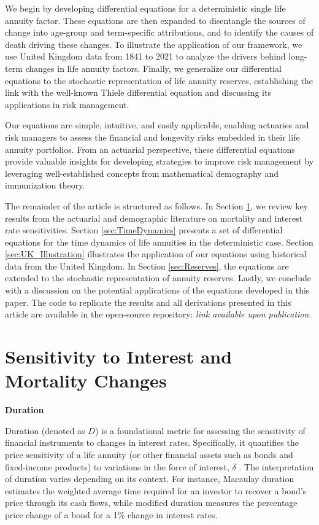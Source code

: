\documentclass[12pt]{article}
\begin{document}
We begin by developing differential equations for a deterministic single life annuity factor. These equations are then expanded to disentangle the sources of change into age-group and term-specific attributions, and to identify the causes of death driving these changes. To illustrate the application of our framework, we use United Kingdom data from 1841 to 2021 to analyze the drivers behind long-term changes in life annuity factors. Finally, we generalize our differential equations to the stochastic representation of life annuity reserves, establishing the link with the well-known Thiele differential equation and discussing its applications in risk management.

Our equations are simple, intuitive, and easily applicable, enabling actuaries and risk managers to assess the financial and longevity risks embedded in their life annuity portfolios. From an actuarial perspective, these differential equations provide valuable insights for developing strategies to improve risk management by leveraging well-established concepts from mathematical demography and immunization theory.

The remainder of the article is structured as follows. In Section \ref{sec:SensitivityMortalityInterest}, we review key results from the actuarial and demographic literature on mortality and interest rate sensitivities. Section \ref{sec:TimeDynamics} presents a set of differential equations for the time dynamics of life annuities in the deterministic case. Section \ref{sec:UK_Illustration} illustrates the application of our equations using historical data from the United Kingdom.  In Section \ref{sec:Reserves}, the equations are extended to the stochastic representation of annuity reserves. Lastly, we conclude with a discussion on the potential applications of the equations developed in this paper. The code to replicate the results and all derivations presented in this article are available in the open-source repository: \textit{link available upon publication}.



\section{Sensitivity to Interest and Mortality Changes}\label{sec:SensitivityMortalityInterest}

\textbf{Duration}

Duration (denoted as $D$) is a foundational metric for assessing the sensitivity of financial instruments to changes in interest rates. Specifically, it quantifies the price sensitivity of a life annuity (or other financial assets such as bonds and fixed-income products) to variations in the force of interest, $\delta$ \citep{milevsky2013life,charupat2016sluggish}. The interpretation of duration varies depending on its context. For instance, Macaulay duration estimates the weighted average time required for an investor to recover a bond's price through its cash flows, while modified duration measures the percentage price change of a bond for a 1\% change in interest rates.
\end{document}
